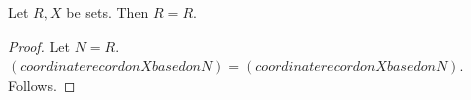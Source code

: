 

\begin{proposition}\label{alias_needs_interface}
    Let $R,X$ be sets.
    Then $R=R$.
\end{proposition}
\begin{proof}
    Let $N=R$.
    $(coordinate record on X based on N)=(coordinate record on X based on N)$.
    Follows.
\end{proof}
